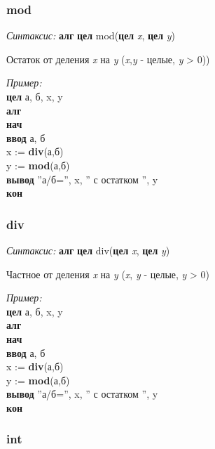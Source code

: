 \normalfont
\subsubsection{mod}

\emph{Синтаксис:} \textbf{алг} \textbf{цел} mod(\textbf{цел} \emph{x}, \textbf{цел} \emph{y})


      

		Остаток от деления \emph{x} на \emph{y}  (\emph{x},\emph{y} - целые, \emph{y} > 0))
      
\emph{Пример:} 
\sffamily
~\\\textbf{цел} а, б, x, y
~\\\textbf{алг
~\\нач
~\\\otstup ввод} а, б
~\\\otstup x := \textbf{div}(а,б)
~\\\otstup y := \textbf{mod}(а,б)
~\\\otstup \textbf{вывод} ''а/б='', x, '' с остатком '', y
~\\\textbf{кон}



 
 

\normalfont
\subsubsection{div}

\emph{Синтаксис:} \textbf{алг} \textbf{цел} div(\textbf{цел} \emph{x}, \textbf{цел} \emph{y})


    
 Частное от деления  \emph{x} на \emph{y}  (\emph{x}, \emph{y} - целые, \emph{y} > 0)

\emph{Пример:} 
\sffamily
~\\\textbf{цел} а, б, x, y
~\\\textbf{алг
~\\нач
~\\\otstup ввод} а, б
~\\\otstup x := \textbf{div}(а,б)
~\\\otstup y := \textbf{mod}(а,б)
~\\\otstup \textbf{вывод} ''а/б='', x, '' с остатком '', y
~\\\textbf{кон}


 



 
\normalfont
\subsubsection{int}
\label{int}

